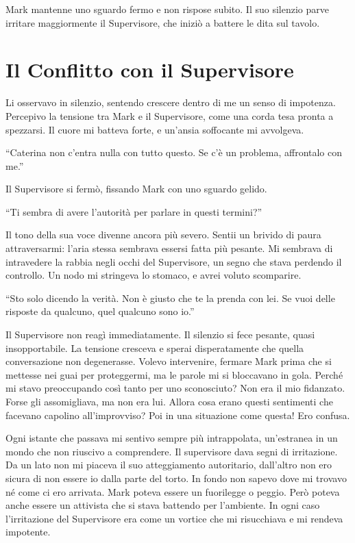 Mark mantenne uno sguardo fermo e non rispose subito.  Il suo silenzio parve  irritare maggiormente il Supervisore, che iniziò a battere le dita sul tavolo.

\section{Il Conflitto con il Supervisore}


Li osservavo in silenzio, sentendo crescere dentro di me un senso di impotenza. Percepivo la tensione tra Mark e il Supervisore, come una corda tesa pronta a spezzarsi. Il cuore mi batteva forte, e un'ansia soffocante mi avvolgeva.

\begin{dialogue}
 \enquote{Caterina non c'entra nulla con tutto questo. Se c'è un problema, affrontalo con me.}
\end{dialogue}

Il Supervisore si fermò, fissando Mark con uno sguardo gelido.

\begin{dialogue}
 \enquote{Ti sembra di avere l'autorità per parlare in questi termini?}
\end{dialogue}

Il tono della sua voce divenne ancora più severo. Sentii un brivido di paura attraversarmi: l'aria stessa sembrava essersi fatta più pesante. Mi sembrava di intravedere la rabbia negli occhi del Supervisore, un segno che stava perdendo il controllo. Un nodo mi stringeva lo stomaco, e avrei voluto scomparire.

\begin{dialogue}
 \enquote{Sto solo dicendo la verità. Non è giusto che te la prenda con lei. Se vuoi delle risposte da qualcuno, quel qualcuno sono io.}
\end{dialogue}

Il Supervisore non reagì immediatamente. Il silenzio si fece pesante, quasi insopportabile. La tensione cresceva  e   sperai disperatamente che quella conversazione non degenerasse. Volevo intervenire, fermare Mark prima che si mettesse nei guai per proteggermi, ma le parole mi si bloccavano in gola.
Perché mi stavo preoccupando così tanto per uno sconosciuto? Non era il mio fidanzato. Forse gli assomigliava, ma non era lui. Allora cosa erano questi sentimenti che facevano capolino all'improvviso? Poi in una situazione come questa! Ero confusa.


Ogni istante che passava mi sentivo sempre più intrappolata, un'estranea in un mondo che non riuscivo a comprendere.
Il supervisore dava segni di irritazione. Da un lato non mi piaceva il suo atteggiamento autoritario, dall'altro non ero sicura di non essere io dalla parte del torto. In fondo non sapevo dove mi trovavo né come ci ero arrivata. Mark poteva essere un fuorilegge o peggio. Però poteva anche essere un attivista che si stava battendo per l'ambiente. In ogni caso  l'irritazione del Supervisore era come un vortice che mi risucchiava e mi rendeva impotente.

